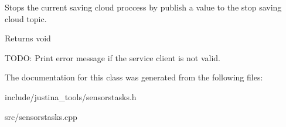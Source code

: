 Stops the current saving cloud proccess by publish a value to the stop saving cloud topic. 

\begin{DoxyReturn}{Returns}
void 
\end{DoxyReturn}
T\+O\+DO\+: Print error message if the service client is not valid.

The documentation for this class was generated from the following files\+:\begin{DoxyCompactItemize}
\item 
include/justina\+\_\+tools/sensorstasks.\+h\item 
src/sensorstasks.\+cpp\end{DoxyCompactItemize}
